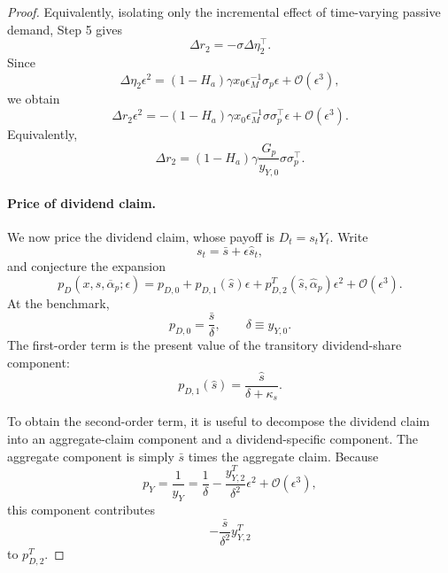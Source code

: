 \begin{proof}
Equivalently, isolating only the incremental effect of time-varying passive demand, Step 5 gives
\begin{equation}
    \Delta r_2=-\sigma\Delta\eta_2^\top.
\end{equation}
Since
\begin{equation}
    \Delta\eta_2\epsilon^2
    =(1-H_a)\gamma x_0\epsilon_M^{-1}\sigma_p\epsilon
    +\mathcal O(\epsilon^3),
\end{equation}
we obtain
\begin{equation}
    \Delta r_2\epsilon^2
    =-(1-H_a)\gamma x_0\epsilon_M^{-1}
    \sigma\sigma_p^\top\epsilon
    +\mathcal O(\epsilon^3).
\end{equation}
Equivalently,
\begin{equation}
    \Delta r_2
    =(1-H_a)\gamma
    \frac{G_p}{y_{Y,0}}\sigma\sigma_p^\top.
\end{equation}


\paragraph{Price of dividend claim.}
We now price the dividend claim, whose payoff is $D_t=s_tY_t$.
Write
\begin{equation}
    s_t=\bar{s}+\epsilon\hat{s}_t,
\end{equation}
and conjecture the expansion
\begin{equation}
    p_D(x,s,\overline{\alpha}_p;\epsilon)
    =p_{D,0}+p_{D,1}(\hat{s})\epsilon+p_{D,2}^T(\hat{s},\hat{\alpha}_p)\epsilon^2+\mathcal{O}(\epsilon^3).
\end{equation}
At the benchmark,
\begin{equation}
    p_{D,0}=\frac{\bar{s}}{\delta},
    \qquad
    \delta\equiv y_{Y,0}.
\end{equation}
The first-order term is the present value of the transitory dividend-share component:
\begin{equation}
    p_{D,1}(\hat{s})=\frac{\hat{s}}{\delta+\kappa_s}.
\end{equation}

To obtain the second-order term, it is useful to decompose the dividend claim into an aggregate-claim component and a dividend-specific component.
The aggregate component is simply $\bar{s}$ times the aggregate claim.
Because
\begin{equation}
    p_Y=\frac{1}{y_Y}
    =\frac{1}{\delta}-\frac{y_{Y,2}^T}{\delta^2}\epsilon^2+\mathcal{O}(\epsilon^3),
\end{equation}
this component contributes
\begin{equation}
    -\frac{\bar{s}}{\delta^2}y_{Y,2}^T
\end{equation}
to $p_{D,2}^T$.


\end{proof}
